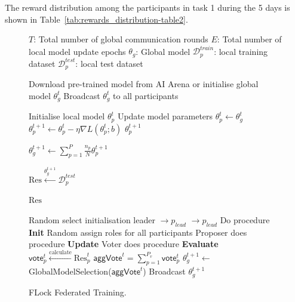\documentclass[conference]{IEEEtran}
\begin{document}
The reward distribution among the participants in task 1 during the 5 days is shown in Table~\ref{tab:rewards_distribution-table2}.





\begin{figure}[t]
\begin{mdframed}[backgroundcolor=gray!10, roundcorner=10pt]
\begin{algorithm}[H]
    \centering
    \begin{algorithmic}[1]
    \Statex 
    \Statex 
        \Statex $T$: Total number of global communication rounds
        \Statex $E$: Total number of local model update epochs
        \Statex $\theta_g$: Global model
        \Statex $\mathcal{D}_p^{train}$: local training dataset 
        \Statex $\mathcal{D}_p^{test}$: local test dataset 

        \State Download pre-trained model from AI Arena or initialise global model $\theta^t_g$
        \State Broadcast $\theta^t_g$ to all participants
    \EndProcedure
    
        \State Initialise local model $\theta^t_p$
        \State Update model parameters  $\theta^t_p \leftarrow \theta^t_g$
        \State $\theta^{t+1}_p \leftarrow \theta^{t}_p - \eta \nabla L(\theta^t_p ; b)$ \textcolor[HTML]{5E81B5}{}
        \State \Return $\theta^{t+1}_p$
    \EndProcedure

        \State $\theta^{t+1}_g \leftarrow \sum_{p=1}^P \frac{n_p}{N} \theta_p^{t+1}$ \textcolor[HTML]{5E81B5}{}

        \State $\text{Res} \xleftarrow{\theta^{t+1}_g} \mathcal{D}_p^{test}$  \textcolor[HTML]{5E81B5}{}
        
        \State \Return $\text{Res}$
    \EndProcedure

        \State Random select initialisation leader $\rightarrow p_{lead}$
        \State $\rightarrow p_{lead}$ Do procedure \textbf{Init}
            \State Random assign roles for all participants
            \State Proposer does procedure \textbf{Update}
            \State Voter does procedure \textbf{Evaluate}
            \State $\mathsf{vote}_p^t \xleftarrow{\text{calculate}} \text{Res}^t_p$
            \State $\mathsf{aggVote}^t= \sum_{p = 1}^{ P_v}  \mathsf{vote}_p^t$ \textcolor[HTML]{5E81B5}{}
            \State $\theta^{t+1}_g \leftarrow$ GlobalModelSelection($\mathsf{aggVote}^t$)
            \State Broadcast $\theta^{t+1}_g$
        \EndFor
    \EndProcedure
    
    \end{algorithmic}
    \caption{FLock Federated Training.}
    \label{algo:federated_learning}
\end{algorithm}
\end{mdframed}
\end{figure}
\end{document}
